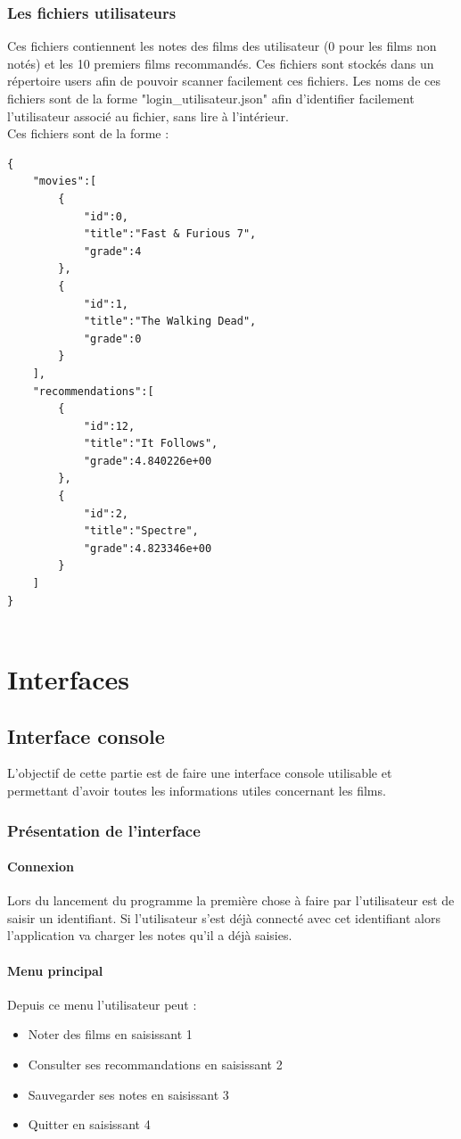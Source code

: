 \documentclass{article}
\begin{document}
\subsubsection{Les fichiers utilisateurs}
Ces fichiers contiennent les notes des films des utilisateur (0 pour les films non notés) et les 10 premiers films recommandés. Ces fichiers sont stockés dans un répertoire users afin de pouvoir scanner facilement ces fichiers. Les noms de ces fichiers sont de la forme "login\_utilisateur.json" afin d’identifier facilement l’utilisateur associé au fichier, sans lire à l’intérieur.\\
Ces fichiers sont de la forme :
\begin{verbatim}
{
    "movies":[
        {
            "id":0,
            "title":"Fast & Furious 7",
            "grade":4
        },
        {
            "id":1,
            "title":"The Walking Dead",
            "grade":0
        }
    ],
    "recommendations":[
        {
            "id":12,
            "title":"It Follows",
            "grade":4.840226e+00
        },
        {
            "id":2,
            "title":"Spectre",
            "grade":4.823346e+00
        }
    ]
}


\end{verbatim}

\section{Interfaces}
\subsection{Interface console}
L’objectif de cette partie est de faire une interface console utilisable et permettant d’avoir toutes les informations utiles concernant les films.

\subsubsection{Présentation de l'interface}

\paragraph{Connexion}
Lors du lancement du programme la première chose à faire par l’utilisateur est de saisir un identifiant. Si l’utilisateur s’est déjà connecté avec cet identifiant alors l’application va charger les notes qu’il a déjà saisies.

\paragraph{Menu principal}
Depuis ce menu l’utilisateur peut :
\begin{itemize}
    \item Noter des films en saisissant 1
    \item Consulter ses recommandations en saisissant 2
    \item Sauvegarder ses notes en saisissant 3
    \item Quitter en saisissant 4
\end{itemize}
\end{document}
